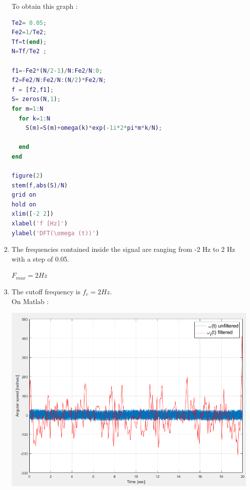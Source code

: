 \documentclass[a4paper,12pt]{article}
\begin{document}
\begin{enumerate}[label={\color{blue}\arabic*)}]
\begin{multicols}{2}
    To obtain this graph :
    
    \begin{lstlisting}[style=Matlab-editor,language=Matlab, basicstyle=\small\ttfamily]
% Plot of the DFT of omega(t)
Te2= 0.05; 
Fe2=1/Te2;
Tf=t(end);
N=Tf/Te2 ;

f1=-Fe2*(N/2-1)/N:Fe2/N:0;
f2=Fe2/N:Fe2/N:(N/2)*Fe2/N;
f = [f2,f1];
S= zeros(N,1);
for m=1:N
  for k=1:N
    S(m)=S(m)+omega(k)*exp(-1i*2*pi*m*k/N);
  
  end
end

figure(2)
stem(f,abs(S)/N)
grid on
hold on
xlim([-2 2])
xlabel('f [Hz]')
ylabel('DFT(\omega (t))')
        \end{lstlisting}
        
    \end{multicols}

    \item 
    The frequencies contained inside the signal are ranging from -2 Hz to 2 Hz with a step of 0.05.
    
    \(F_{max} = 2 Hz\)
    \newpage

    \item 
    The cutoff frequency is \(f_c = 2 Hz\). \\
    On Matlab :
    \begin{multicols}{2}
    
        \begin{flushleft}
            \includegraphics[scale=0.32]{Images/Omega_Filtered.png}
            \label{Figure3}
        \end{flushleft}
        

\end{multicols}
\end{enumerate}
\end{document}
